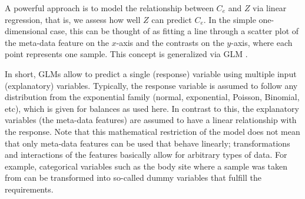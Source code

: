 

A powerful approach is to model the relationship between $C_e$ and $Z$ via linear regression,
that is, we assess how well $Z$ can predict $C_e$.
In the simple one-dimensional case, this can be thought of as fitting a line through a scatter plot
of the meta-data feature on the $x$-axis and the contrasts on the $y$-axis, where each point represents one sample.
This concept is generalized via \acf{GLM} \cite{Nelder1972,McCullagh1989,Agresti2018}.

In short, \acp{GLM} allow to predict a single (response) variable using multiple input (explanatory) variables.
Typically, the response variable is assumed to follow any distribution from the exponential family
(normal, exponential, Poisson, Binomial, etc), which is given for balances as used here.
In contrast to this, the explanatory variables (the meta-data features)
are assumed to have a linear relationship with the response.
Note that this mathematical restriction of the model does not mean
that only meta-data features can be used that behave linearly;
transformations and interactions of the features basically allow for arbitrary types of data.
For example, categorical variables such as the body site where a sample was taken from can be transformed
into so-called dummy variables that fulfill the requirements.

